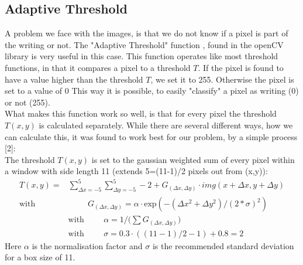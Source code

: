 \documentclass[12pt]{article}
\begin{document}
		
	\subsection{Adaptive Threshold} %
		A problem we face with the images, is that we do not know if a pixel is part of the writing or not.
		The "Adaptive Threshold" function \cite{adaThresh}, found in the openCV library is very useful in this case. %
		This function operates like most threshold functions, in that it compares a pixel to a threshold $T$.
		If the pixel is found to have a value higher than the threshold $T$, we set it to 255.
		Otherwise the pixel is set to a value of 0 \cite{cvAdaThresh}
		This way it is possible, to easily "classify" a pixel as writing (0) or not (255).\\
		What makes this function work so well, is that for every pixel the threshold $T(x,y)$ is calculated separately.
		While there are several different ways, how we can calculate this, it was found to work best for our problem, by a simple process [2]:\\
		The threshold $T(x,y)$ is set to the gaussian weighted sum of every pixel within a window with side length 11 (extends 5=(11-1)/2 pixels out from (x,y)):
		\begin{align}
			T(x,y)=&\sum_{\Delta x=-5}^{5}\sum_{\Delta y=-5}^{5} -2 + G_{(\Delta x,\Delta y)} \cdot img(x+\Delta x,y+\Delta y)\\
			\mathrm{with}& \hspace{1cm} G_{(\Delta x,\Delta y)} = \alpha \cdot \mathrm{exp}(-(\Delta x ^2 +\Delta y^2)/(2*\sigma)^2)\\ %
			&\mathrm{with} \hspace{1cm}\alpha = 1/\Big(\sum G_{(\Delta x,\Delta y)}\Big)\\
			&\mathrm{with} \hspace{1cm}\sigma = 0.3 \cdot ((11-1)/2-1) + 0.8 = 2
		\end{align}
		Here $\alpha$ is the normalisation factor and $\sigma$ is the recommended standard deviation for a box size of 11.
	
\end{document}
